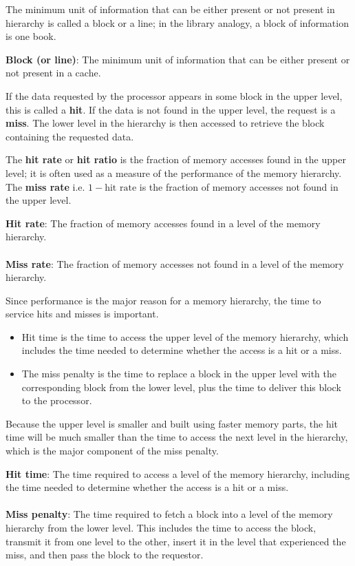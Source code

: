 \documentclass[10pt,a4paper]{article}
\begin{document}
The minimum unit of information that can be either present or not present in hierarchy is called a block or a line; in the library analogy, a block of information is one book.

\begin{tcolorbox}[breakable,colback=white]
\textbf{Block (or line)}: The minimum unit of information that can be either present or not present in a cache.
\end{tcolorbox}

If the data requested by the processor appears in some block in the upper level, this is called a
\textbf{hit}. If the data is not found in the upper level, the request is a \textbf{miss}. The lower level in the hierarchy is then accessed to retrieve the block containing the 
requested data. 

The \textbf{hit rate} or \textbf{hit ratio} is the fraction of memory accesses found in the upper
level; it is often used as a measure of the performance of the memory hierarchy. The \textbf{miss
rate} i.e. $1 - \text{hit rate}$ is the fraction of memory accesses not found in the upper level.

\begin{tcolorbox}[breakable,colback=white]
\textbf{Hit rate}:  The fraction of memory accesses found in a level of the memory hierarchy.
\\
\\
\textbf{Miss rate}: The fraction of memory accesses not found in a level of the memory hierarchy.
\end{tcolorbox}

\pagebreak

Since performance is the major reason for a memory hierarchy, the time to service hits and misses is
important.
\begin{itemize}
    \item Hit time is the time to access the upper level of the memory hierarchy, which includes
    the time needed to determine whether the access is a hit or a miss.
    \item The miss penalty is the time to replace a block in the upper level with the corresponding block from the lower level, plus the time to deliver this block to the processor.
\end{itemize}  
Because the upper level is smaller and built using faster memory parts, the hit time will be much smaller than the time to access the next level in the hierarchy, which is the major component of the miss penalty.

\begin{tcolorbox}[breakable,colback=white]
\textbf{Hit time}: The time required to access a level of the memory hierarchy, including the time needed 
to determine whether the access is a hit or a miss.
\\
\\
\textbf{Miss penalty}: The time required to fetch a block into a level of the memory hierarchy from the lower 
level. This includes the time to access the block, transmit it from one level to the other, insert it in
the level that experienced the miss, and then pass the block to the requestor.
\end{tcolorbox}
\end{document}
